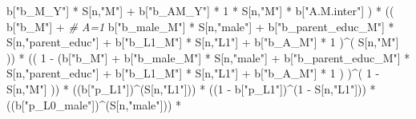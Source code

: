 \documentclass[
]{book}
\newenvironment{Shaded}{\begin{snugshade}}{\end{snugshade}}
\newcommand{\CommentTok}[1]{\textcolor[rgb]{0.56,0.35,0.01}{\textit{#1}}}
\newcommand{\DecValTok}[1]{\textcolor[rgb]{0.00,0.00,0.81}{#1}}
\newcommand{\NormalTok}[1]{#1}
\newcommand{\SpecialCharTok}[1]{\textcolor[rgb]{0.00,0.00,0.00}{#1}}
\newcommand{\StringTok}[1]{\textcolor[rgb]{0.31,0.60,0.02}{#1}}
\begin{document}
\begin{Shaded}
\begin{Highlighting}[]
\NormalTok{                             b[}\StringTok{"b\_M\_Y"}\NormalTok{] }\SpecialCharTok{*}\NormalTok{ S[n,}\StringTok{"M"}\NormalTok{] }\SpecialCharTok{+}
\NormalTok{                             b[}\StringTok{"b\_AM\_Y"}\NormalTok{] }\SpecialCharTok{*} \DecValTok{1} \SpecialCharTok{*}\NormalTok{ S[n,}\StringTok{"M"}\NormalTok{] }\SpecialCharTok{*}\NormalTok{ b[}\StringTok{"A.M.inter"}\NormalTok{] ) }\SpecialCharTok{*}
\NormalTok{      (( b[}\StringTok{"b\_M"}\NormalTok{] }\SpecialCharTok{+}                                                             \CommentTok{\# A\textquotesingle{}=1}
\NormalTok{           b[}\StringTok{"b\_male\_M"}\NormalTok{] }\SpecialCharTok{*}\NormalTok{ S[n,}\StringTok{"male"}\NormalTok{] }\SpecialCharTok{+} 
\NormalTok{           b[}\StringTok{"b\_parent\_educ\_M"}\NormalTok{] }\SpecialCharTok{*}\NormalTok{ S[n,}\StringTok{"parent\_educ"}\NormalTok{] }\SpecialCharTok{+} 
\NormalTok{           b[}\StringTok{"b\_L1\_M"}\NormalTok{] }\SpecialCharTok{*}\NormalTok{ S[n,}\StringTok{"L1"}\NormalTok{] }\SpecialCharTok{+}
\NormalTok{           b[}\StringTok{"b\_A\_M"}\NormalTok{] }\SpecialCharTok{*} \DecValTok{1}\NormalTok{ )}\SpecialCharTok{\^{}}\NormalTok{( S[n,}\StringTok{"M"}\NormalTok{] )) }\SpecialCharTok{*}
\NormalTok{      (( }\DecValTok{1} \SpecialCharTok{{-}}\NormalTok{ (b[}\StringTok{"b\_M"}\NormalTok{] }\SpecialCharTok{+} 
\NormalTok{                b[}\StringTok{"b\_male\_M"}\NormalTok{] }\SpecialCharTok{*}\NormalTok{ S[n,}\StringTok{"male"}\NormalTok{] }\SpecialCharTok{+} 
\NormalTok{                b[}\StringTok{"b\_parent\_educ\_M"}\NormalTok{] }\SpecialCharTok{*}\NormalTok{ S[n,}\StringTok{"parent\_educ"}\NormalTok{] }\SpecialCharTok{+} 
\NormalTok{                b[}\StringTok{"b\_L1\_M"}\NormalTok{] }\SpecialCharTok{*}\NormalTok{ S[n,}\StringTok{"L1"}\NormalTok{] }\SpecialCharTok{+}
\NormalTok{                b[}\StringTok{"b\_A\_M"}\NormalTok{] }\SpecialCharTok{*} \DecValTok{1}\NormalTok{ ) )}\SpecialCharTok{\^{}}\NormalTok{( }\DecValTok{1} \SpecialCharTok{{-}}\NormalTok{ S[n,}\StringTok{"M"}\NormalTok{] )) }\SpecialCharTok{*}
\NormalTok{      ((b[}\StringTok{"p\_L1"}\NormalTok{])}\SpecialCharTok{\^{}}\NormalTok{(S[n,}\StringTok{"L1"}\NormalTok{])) }\SpecialCharTok{*}
\NormalTok{      ((}\DecValTok{1} \SpecialCharTok{{-}}\NormalTok{ b[}\StringTok{"p\_L1"}\NormalTok{])}\SpecialCharTok{\^{}}\NormalTok{(}\DecValTok{1} \SpecialCharTok{{-}}\NormalTok{ S[n,}\StringTok{"L1"}\NormalTok{])) }\SpecialCharTok{*}
\NormalTok{      ((b[}\StringTok{"p\_L0\_male"}\NormalTok{])}\SpecialCharTok{\^{}}\NormalTok{(S[n,}\StringTok{"male"}\NormalTok{])) }\SpecialCharTok{*} 

\end{Highlighting}
\end{Shaded}
\end{document}
